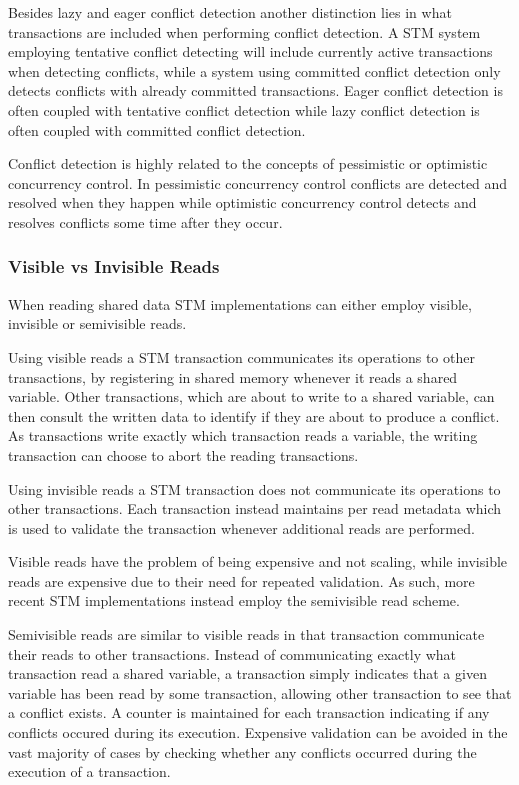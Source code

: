 Besides lazy and eager conflict detection another distinction lies in what transactions are included when performing conflict detection. A \ac{STM} system employing tentative conflict detecting will include currently active transactions when detecting conflicts, while a system using committed conflict detection only detects conflicts with already committed transactions. Eager conflict detection is often coupled with tentative conflict detection while lazy conflict detection is often coupled with committed conflict detection\cite[p. 22]{harris2010transactional}.

Conflict detection is highly related to the concepts of pessimistic or optimistic concurrency control. In pessimistic concurrency control conflicts are detected and resolved when they happen\cite[p. 20]{harris2010transactional} while optimistic concurrency control detects and resolves conflicts some time after they occur\cite[p. 20]{harris2010transactional}.

\subsubsection{Visible vs Invisible Reads}
When reading shared data \ac{STM} implementations can either employ visible, invisible or semivisible reads.

Using visible reads a \ac{STM} transaction communicates its operations to other transactions, by registering in shared memory whenever it reads a shared variable\cite[p. 2]{lev2009anatomy}\cite[p. 2085]{herlihy2011tm}. Other transactions, which are about to write to a shared variable, can then consult the written data to identify if they are about to produce a conflict. As transactions write exactly which transaction reads a variable, the writing transaction can choose to abort the reading transactions\cite[p. 2]{lev2009anatomy}.

Using invisible reads a \ac{STM} transaction does not communicate its operations to other transactions\cite[p. 114]{imbs2012virtual}. Each transaction instead maintains per read metadata which is used to validate the transaction whenever additional reads are performed\cite[p. 2085]{herlihy2011tm}.

Visible reads have the problem of being expensive and not scaling, while invisible reads are expensive due to their need for repeated validation. As such, more recent \ac{STM} implementations instead employ the semivisible read scheme\cite[p. 2085]{herlihy2011tm}.

Semivisible reads are similar to visible reads in that transaction communicate their reads to other transactions. Instead of communicating exactly what transaction read a shared variable, a transaction simply indicates that a given variable has been read by some transaction, allowing other transaction to see that a conflict exists. A counter is maintained for each transaction indicating if any conflicts occured during its execution. Expensive validation can be avoided in the vast majority of cases by checking whether any conflicts occurred during the execution of a transaction\cite[p. 2]{lev2009anatomy}.

